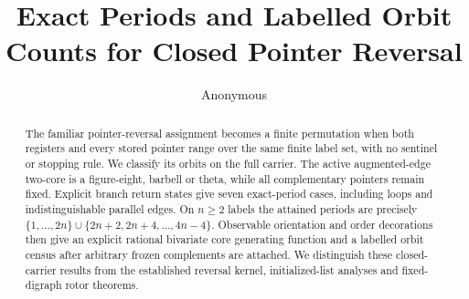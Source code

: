 \documentclass[10pt]{article}
\title{Exact Periods and Labelled Orbit Counts for Closed Pointer Reversal}
\author{Anonymous}
\date{}
\begin{document}
\maketitle
\begin{abstract}
The familiar pointer-reversal assignment becomes a finite permutation when
both registers and every stored pointer range over the same finite label set,
with no sentinel or stopping rule. We classify its orbits on the full carrier.
The active augmented-edge two-core is a figure-eight, barbell or theta, while
all complementary pointers remain fixed. Explicit branch return states give
seven exact-period cases, including loops and indistinguishable parallel
edges. On $n\ge2$ labels the attained periods are precisely
$\{1,\ldots,2n\}\cup\{2n+2,2n+4,\ldots,4n-4\}$.
Observable orientation and order decorations then give an explicit rational
bivariate core generating function and a labelled orbit census after arbitrary
frozen complements are attached. We distinguish these closed-carrier results
from the established reversal kernel, initialized-list analyses and
fixed-digraph rotor theorems.
\end{abstract}







\end{document}
